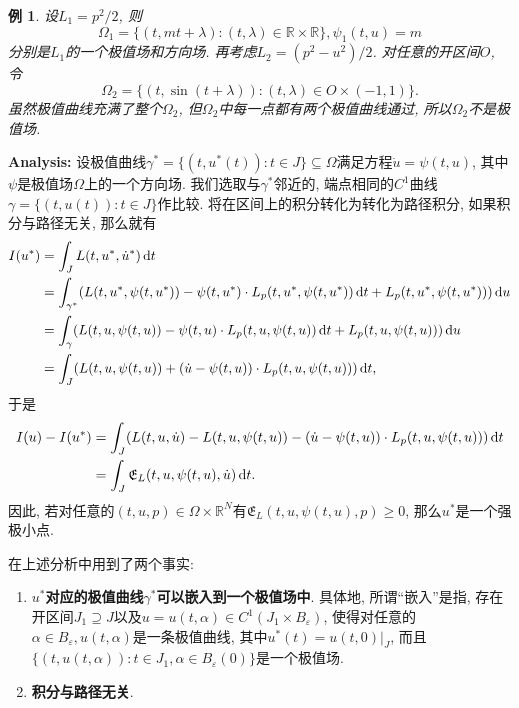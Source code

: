 \documentclass[12pt,a4paper]{article}
\newtheorem{example}[theorem]{例}
\begin{document}
\begin{example}
    设$L_1 = p^2/2$, 则
    \begin{equation*}
        \Omega_1 = \{(t, mt + \lambda)\colon (t, \lambda) \in \mathbb{R} \times \mathbb{R}\}, \psi_1(t, u) = m
    \end{equation*}
    分别是$L_1$的一个极值场和方向场. 再考虑$L_2 = (p^2 - u^2)/2$. 对任意的开区间$O$, 令 
    \begin{equation*}
        \Omega_2 = \{(t, \sin(t + \lambda))\colon (t, \lambda) \in O \times (-1, 1)\}.
    \end{equation*}
    虽然极值曲线充满了整个$\Omega_2$, 但$\Omega_2$中每一点都有两个极值曲线通过, 所以$\Omega_2$不是极值场.
\end{example}

\textbf{Analysis:} 设极值曲线$\gamma^* = \{(t, u^*(t))\colon t \in J\} \subseteq \Omega$满足方程$\dot u = \psi(t, u)$, 其中$\psi$是极值场$\Omega$上的一个方向场.
我们选取与$\gamma^*$邻近的, 端点相同的$C^1$曲线$\gamma = \{(t, u(t))\colon t \in J\}$作比较.
将在区间上的积分转化为转化为路径积分, 如果积分与路径无关, 那么就有
\begin{align*} 
    I(u^*) &= \int_JL(t, u^*, \dot u^*) \,{\rm d}t \\ 
    &= \int_{\gamma^*}(L(t, u^*, \psi(t, u^*)) - \psi(t, u^*)\cdot L_p(t, u^*, \psi(t, u^*)) \,{\rm d}t + L_p(t, u^*, \psi(t, u^*))) \,{\rm d}u \\  
    &= \int_{\gamma}(L(t, u, \psi(t, u)) - \psi(t, u)\cdot L_p(t, u, \psi(t, u)) \,{\rm d}t + L_p(t, u, \psi(t, u))) \,{\rm d}u \\  
    &= \int_J(L(t, u, \psi(t, u)) + (\dot u - \psi(t, u))\cdot L_p(t, u, \psi(t, u))) \,{\rm d}t, 
\end{align*}
于是 
\begin{align*}
    I(u) - I(u^*) &= \int_J(L(t, u, \dot u) - L(t, u, \psi(t, u)) - (\dot u - \psi(t, u))\cdot L_p(t, u, \psi(t, u))) \,{\rm d}t \\  
    &= \int_J\mathfrak{E}_L(t, u, \psi(t, u), \dot u) \,{\rm d}t.
\end{align*} 
因此, 若对任意的$(t, u, p) \in \Omega \times  \mathbb{R}^N$有$\mathfrak{E}_L(t, u, \psi(t, u), p) \geq 0$, 那么$u^*$是一个强极小点.

在上述分析中用到了两个事实:

\begin{enumerate}
    \item \textbf{$u^*$对应的极值曲线$\gamma^*$可以嵌入到一个极值场中}. 具体地, 所谓``嵌入''是指, 存在开区间$J_1 \supseteq J$以及$u = u(t, \alpha) \in C^1(J_1 \times B_{\varepsilon})$, 使得对任意的$\alpha \in B_{\varepsilon}, u(t, \alpha)$是一条极值曲线, 其中$u^*(t) = u(t, 0)|_J$,
    而且$\{(t, u(t, \alpha))\colon t \in J_1, \alpha \in B_{\varepsilon}(0)\}$是一个极值场.
    \item \textbf{积分与路径无关}.
\end{enumerate}
\end{document}
